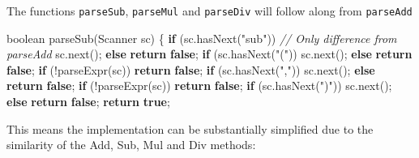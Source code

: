 \documentclass[
]{book}
\newenvironment{Shaded}{\begin{snugshade}}{\end{snugshade}}
\newcommand{\BuiltInTok}[1]{#1}
\newcommand{\CommentTok}[1]{\textcolor[rgb]{0.56,0.35,0.01}{\textit{#1}}}
\newcommand{\DataTypeTok}[1]{\textcolor[rgb]{0.13,0.29,0.53}{#1}}
\newcommand{\FunctionTok}[1]{\textcolor[rgb]{0.00,0.00,0.00}{#1}}
\newcommand{\KeywordTok}[1]{\textcolor[rgb]{0.13,0.29,0.53}{\textbf{#1}}}
\newcommand{\NormalTok}[1]{#1}
\newcommand{\StringTok}[1]{\textcolor[rgb]{0.31,0.60,0.02}{#1}}
\begin{document}
The functions \texttt{parseSub}, \texttt{parseMul} and \texttt{parseDiv} will follow along from \texttt{parseAdd}

\begin{Shaded}
\begin{Highlighting}[]
\DataTypeTok{boolean} \FunctionTok{parseSub}\NormalTok{(}\BuiltInTok{Scanner}\NormalTok{ sc) \{}
   \KeywordTok{if}\NormalTok{ (sc.}\FunctionTok{hasNext}\NormalTok{(}\StringTok{"sub"}\NormalTok{))       }\CommentTok{// Only difference from parseAdd}
\NormalTok{    sc.}\FunctionTok{next}\NormalTok{();}
   \KeywordTok{else}
    \KeywordTok{return} \KeywordTok{false}\NormalTok{;}
   \KeywordTok{if}\NormalTok{ (sc.}\FunctionTok{hasNext}\NormalTok{(}\StringTok{"("}\NormalTok{))}
\NormalTok{    sc.}\FunctionTok{next}\NormalTok{();}
   \KeywordTok{else}
    \KeywordTok{return} \KeywordTok{false}\NormalTok{;}
   \KeywordTok{if}\NormalTok{ (!}\FunctionTok{parseExpr}\NormalTok{(sc))}
    \KeywordTok{return} \KeywordTok{false}\NormalTok{;}
   \KeywordTok{if}\NormalTok{ (sc.}\FunctionTok{hasNext}\NormalTok{(}\StringTok{","}\NormalTok{))}
\NormalTok{    sc.}\FunctionTok{next}\NormalTok{();}
   \KeywordTok{else}
    \KeywordTok{return} \KeywordTok{false}\NormalTok{;}
   \KeywordTok{if}\NormalTok{ (!}\FunctionTok{parseExpr}\NormalTok{(sc))}
    \KeywordTok{return} \KeywordTok{false}\NormalTok{;}
   \KeywordTok{if}\NormalTok{ (sc.}\FunctionTok{hasNext}\NormalTok{(}\StringTok{")"}\NormalTok{))}
\NormalTok{    sc.}\FunctionTok{next}\NormalTok{();}
   \KeywordTok{else}
    \KeywordTok{return} \KeywordTok{false}\NormalTok{;}
   \KeywordTok{return} \KeywordTok{true}\NormalTok{;}
\end{Highlighting}
\end{Shaded}

This means the implementation can be substantially simplified due to the similarity of the Add, Sub, Mul and Div methods:
\end{document}
